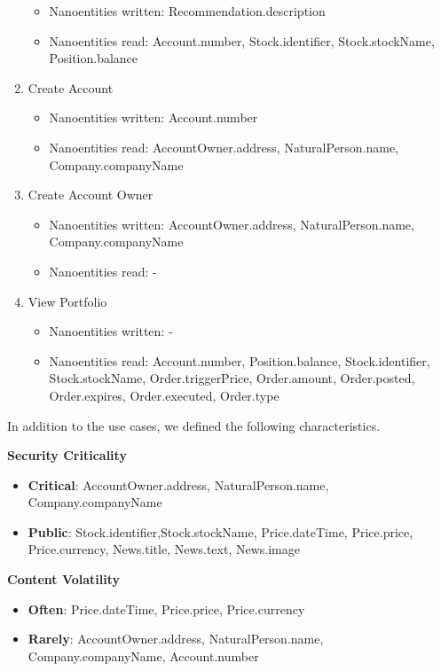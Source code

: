 \begin{enumerate}
	\begin{itemize}
	\item Nanoentities written: Recommendation.description
	\item Nanoentities read: Account.number, Stock.identifier, Stock.stockName, Position.balance
	\end{itemize}
\item Create Account
	\begin{itemize}
	\item Nanoentities written: Account.number
	\item Nanoentities read: AccountOwner.address, NaturalPerson.name, Company.companyName
	\end{itemize}
\item Create Account Owner
	\begin{itemize}
	\item Nanoentities written: AccountOwner.address, NaturalPerson.name, Company.companyName
	\item Nanoentities read: -
	\end{itemize}
\item View Portfolio
	\begin{itemize}
	\item Nanoentities written: -
	\item Nanoentities read: Account.number, Position.balance, Stock.identifier, Stock.stockName, Order.triggerPrice, Order.amount, Order.posted, Order.expires, Order.executed, Order.type
	\end{itemize}
\end{enumerate}

In addition to the use cases, we defined the following characteristics.

\textbf{Security Criticality}

\begin{itemize}
\item \textbf{Critical}: AccountOwner.address, NaturalPerson.name, Company.companyName
\item \textbf{Public}: Stock.identifier,Stock.stockName, Price.dateTime, Price.price, Price.currency, News.title, News.text, News.image
\end{itemize} 

\textbf{Content Volatility}

\begin{itemize}
\item \textbf{Often}: Price.dateTime, Price.price, Price.currency
\item \textbf{Rarely}: AccountOwner.address, NaturalPerson.name, Company.companyName, Account.number
\end{itemize}

